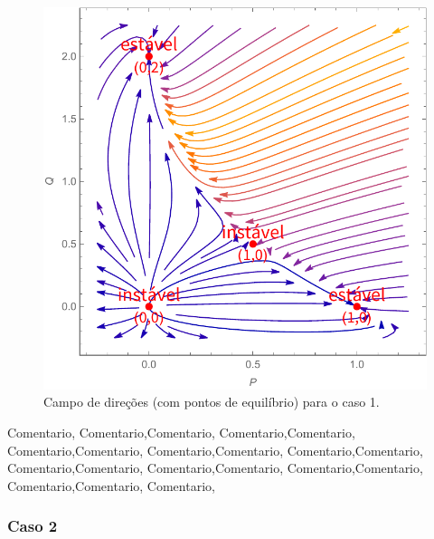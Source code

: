 \begin{figure}[htbp]
\centering
\includegraphics[keepaspectratio=true,scale=0.8]{caso1_c.pdf}
\caption{Campo de direções (com pontos de equilíbrio) para o caso 1.}
\label{fig:xxx}
\end{figure}
\bigskip
\noindent
Comentario, Comentario,Comentario, Comentario,Comentario, Comentario,Comentario, Comentario,Comentario, Comentario,Comentario, Comentario,Comentario, Comentario,Comentario, Comentario,Comentario, Comentario,Comentario, Comentario,
\pagebreak




















\subsubsection{Caso 2}


